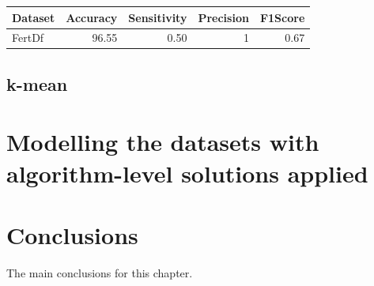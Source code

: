 \begin{table}[ht]
\centering
\begin{tabular}{lrrrr}
  \hline
Dataset & Accuracy & Sensitivity & Precision & F1Score \\ 
  \hline
FertDf & 96.55 & 0.50 &   1 & 0.67 \\ 
   \hline
\end{tabular}
\end{table}


\subsection{k-mean}


\section{Modelling the datasets with algorithm-level solutions applied}

\section{Conclusions}

The main conclusions for this chapter.


